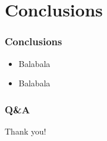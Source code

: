 \documentclass[]{beamer}
\begin{document}


\section{Conclusions}
\begin{frame}\frametitle{Conclusions}
\begin{center}
\begin{itemize}
\item Balabala
\item Balabala
\end{itemize}
\end{center}
\end{frame}



\begin{frame}\frametitle{Q\&A}
\begin{center}
\huge{Thank you!}
\end{center}
\end{frame}
\end{document}
